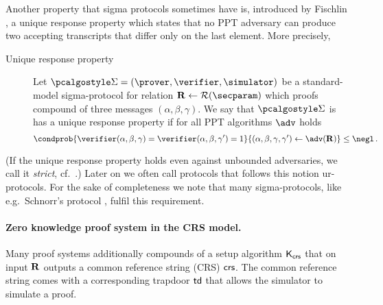\documentclass[runningheads,11pt]{llncs}
\theoremstyle{definition}
\begin{document}
Another property that sigma protocols sometimes have is, introduced by Fischlin \cite{C:Fischlin05}, a unique response property which states that no PPT adversary  can produce two accepting transcripts that differ only on the last element.
More precisely,
\begin{description}
	\item[Unique response property] Let $\sigmaprot = (\prover, \verifier, \simulator)$ be a standard-model sigma-protocol for relation $\REL \gets \RELGEN(\secparam)$ which proofs compound of three messages $(\alpha, \beta, \gamma)$. We say that $\sigmaprot$ is has a unique response property if for all PPT algorithms $\adv$ holds
	\[
	\condprob{\verifier (\alpha, \beta, \gamma) = \verifier (\alpha, \beta, \gamma')  = 1}{(\alpha, \beta, \gamma, \gamma') \gets \adv(\REL)} \leq \negl\,.
	\]
\end{description}
(If the unique response property holds even against unbounded adversaries, we call it \emph{strict}, cf.~\cite{INDOCRYPT:FKMV12}.)
Later on we often call protocols that follows this notion ur-protocols.
For the sake of completeness we note that many sigma-protocols, like e.g.~Schnorr's protocol \cite{C:Schnorr89}, fulfil this requirement.

\paragraph{Zero knowledge proof system in the CRS model.}
Many proof systems additionally compounds of a setup algorithm $\mathsf{K}_{\mathsf{crs}}$ that on input $\mathbf{R}$ outputs a common reference string (CRS) $\mathsf{crs}$. The common reference string comes with a corresponding trapdoor $\mathsf{td}$ that allows the simulator to simulate a proof.
\end{document}
